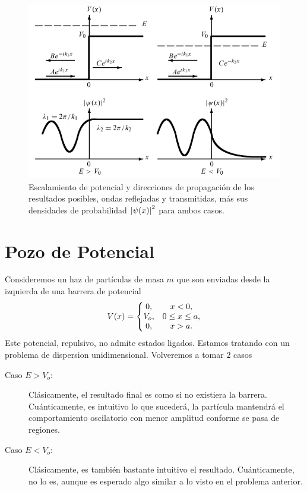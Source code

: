 \begin{figure}[H]
    \centering
    \includegraphics[scale=0.4]{img/potenciales.png}
    \caption{Escalamiento de potencial y direcciones de propagación de los resultados posibles, ondas reflejadas y transmitidas, más sus densidades de probabilidad $\abs{\psi (x)}^2$ para ambos casos.}
    \label{fig:potenciales}
\end{figure}




\section{Pozo de Potencial}
Consideremos un haz de partículas de masa $m$ que son enviadas desde la izquierda de una barrera de potencial
    \begin{equation}
        V(x) = \left\{ \mqty{0, & x<0, \\ V_o, & 0\leq x \leq a, \\ 0, & x > a.} \right.
    \end{equation}
Este potencial, repulsivo, no admite estados ligados. Estamos tratando con un problema de dispersion unidimensional. Volveremos a tomar $2$ casos

\begin{description}
    \item[Caso $E > V_o$: ] Clásicamente, el resultado final es como si no existiera la barrera. Cuánticamente, es intuitivo lo que sucederá, la partícula mantendrá el comportamiento oscilatorio con menor amplitud conforme se pasa de regiones. 
    \item[Caso $E < V_o$: ] Clásicamente, es también bastante intuitivo el resultado. Cuánticamente, no lo es, aunque es esperado algo similar a lo visto en el problema anterior.
\end{description}

